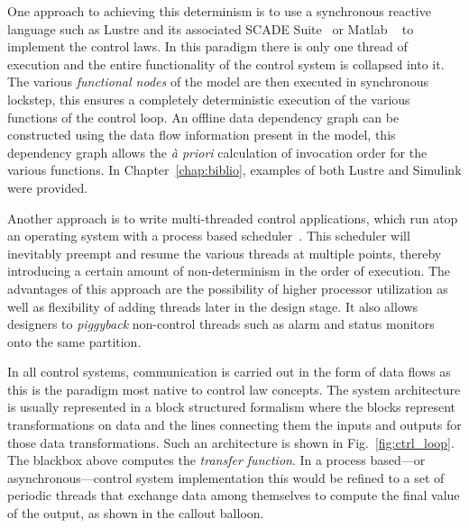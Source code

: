 One approach to achieving this determinism is to use a synchronous
reactive language such as Lustre and its associated SCADE
Suite~\cite{halbwachs@ieee91} or Matlab \simu~\cite{simulink} to
implement the control laws. In this paradigm there is only one thread
of execution and the entire functionality of the control system is
collapsed into it. The various \emph{functional nodes} of the model
are then executed in synchronous lockstep, this ensures a completely
deterministic execution of the various functions of the control
loop. An offline data dependency graph can be constructed using the
data flow information present in the model, this dependency graph
allows the \emph{\`a priori} calculation of invocation order for the
various functions. In Chapter~\ref{chap:biblio}, examples of both
Lustre and Simulink were provided.

Another approach is to write multi-threaded control applications,
which run atop an operating system with a process based
scheduler~\cite{butler@spie93}. This scheduler will inevitably preempt
and resume the various threads at multiple points, thereby introducing
a certain amount of non-determinism in the order of execution. The
advantages of this approach are the possibility of higher processor
utilization as well as flexibility of adding threads later in the
design stage. It also allows designers to \emph{piggyback} non-control
threads such as alarm and status monitors onto the same partition.

In all control systems, communication is carried out in the form of
data flows as this is the paradigm most native to control law
concepts. The system architecture is usually represented in a block
structured formalism where the blocks represent transformations on
data and the lines connecting them the inputs and outputs for those
data transformations. Such an architecture is shown in
Fig.~\ref{fig:ctrl_loop}. The blackbox above computes the
\emph{transfer function}. In a process based---or
asynchronous---control system implementation this would be refined to
a set of periodic threads that exchange data among themselves to
compute the final value of the output, as shown in the callout
balloon.

